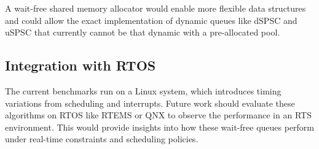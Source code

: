 A wait-free shared memory allocator would enable more flexible data structures and could allow the exact implementation of dynamic queues like \ac{dSPSC} and \ac{uSPSC} that currently cannot be that dynamic with a pre-allocated pool.

\subsection{Integration with \acf{RTOS}}
The current benchmarks run on a Linux system, which introduces timing variations from scheduling and interrupts. Future work should evaluate these algorithms on \ac{RTOS} like RTEMS or QNX to observe the performance in an \ac{RTS} environment. This would provide insights into how these wait-free queues perform under real-time constraints and scheduling policies.